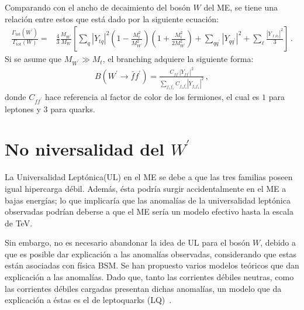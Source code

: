 %
Comparando con el ancho de decaimiento del bosón $W$ del ME, se tiene una relación entre estos que está dado por la siguiente ecuación:
%
\begin{align*}
\frac{\Gamma_{\text{tot}}(W^{\prime})}{\Gamma_{\text{tot}}(W)}  =& \frac{4}{3} \frac{M_{W^{\prime}}}{M_{W}}\left[\sum_{q}|Y_{tq}|^2 \left( 1 - \frac{M_{t}^2}{M_{W^{\prime}}^2} \right)\left( 1 + \frac{M_{t}^2}{2M_{W^{\prime}}^2} \right) + \sum_{q q^{\prime}}|Y_{q q^{\prime}}|^2 + \sum_{\ell} \frac{|Y_{\ell \bar{\nu}_{\ell}}|^2}{3}\right]\,.
\end{align*}
%
Si se asume que $M_{W^{\prime}} \gg M_{t}$, el branching adquiere la siguiente forma:
%
\begin{align}\label{Eq:Branching}
B(W^{\prime} \to \bar{f} f^{\prime}) = \frac{C_{f f^{\prime}}|Y_{f f^{\prime}}|^2}{ \sum_{f_1 f_1^{\prime}} C_{f_1 f_1^{\prime}} |Y_{f_1 f_1^{\prime}}|^2 }\,,
\end{align}
%
donde $C_{f f^{\prime}}$ hace referencia al factor de color de los fermiones, el cual es $1$ para leptones y $3$ para quarks. 

\section{No niversalidad del $W^{\prime}$}\label{Sec:NoUL}

La Universalidad Leptónica(UL) en el ME se debe a que las tres familias poseen igual hipercarga débil. Además, ésta podría surgir accidentalmente en el ME a bajas energías; lo que implicaría que las anomalías de la universalidad leptónica observadas podrían deberse a que el ME sería un modelo efectivo hasta la escala de TeV.

Sin embargo, no es necesario abandonar la idea de UL para el bosón $W$, debido a que es posible dar explicación a las anomalías observadas, considerando que estas están asociadas con física BSM. Se han propuesto varios modelos teóricos que dan explicación a las anomalías. Dado que, tanto las corrientes débiles neutras, como las corrientes débiles cargadas presentan dichas anomalías, un modelo que da explicación a éstas es el de leptoquarks (LQ)~\cite{Sakaki:2013bfa}. 

